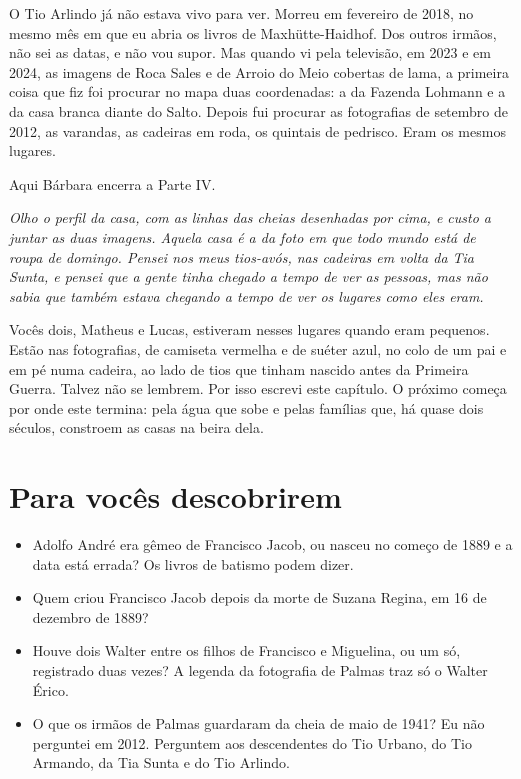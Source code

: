 \documentclass[
  brazilian,
  11pt,
  openany]{book}
\providecommand{\tightlist}{%
  \setlength{\itemsep}{0pt}\setlength{\parskip}{0pt}}
\begin{document}
O Tio Arlindo já não estava vivo para ver. Morreu em fevereiro de 2018,
no mesmo mês em que eu abria os livros de Maxhütte-Haidhof. Dos outros
irmãos, não sei as datas, e não vou supor. Mas quando vi pela televisão,
em 2023 e em 2024, as imagens de Roca Sales e de Arroio do Meio cobertas
de lama, a primeira coisa que fiz foi procurar no mapa duas coordenadas:
a da Fazenda Lohmann e a da casa branca diante do Salto. Depois fui
procurar as fotografias de setembro de 2012, as varandas, as cadeiras em
roda, os quintais de pedrisco. Eram os mesmos lugares.

Aqui Bárbara encerra a Parte IV.

\emph{Olho o perfil da casa, com as linhas das cheias desenhadas por
cima, e custo a juntar as duas imagens. Aquela casa é a da foto em que
todo mundo está de roupa de domingo. Pensei nos meus tios-avós, nas
cadeiras em volta da Tia Sunta, e pensei que a gente tinha chegado a
tempo de ver as pessoas, mas não sabia que também estava chegando a
tempo de ver os lugares como eles eram.}

Vocês dois, Matheus e Lucas, estiveram nesses lugares quando eram
pequenos. Estão nas fotografias, de camiseta vermelha e de suéter azul,
no colo de um pai e em pé numa cadeira, ao lado de tios que tinham
nascido antes da Primeira Guerra. Talvez não se lembrem. Por isso
escrevi este capítulo. O próximo começa por onde este termina: pela água
que sobe e pelas famílias que, há quase dois séculos, constroem as casas
na beira dela.

\section{Para vocês descobrirem}\label{para-vocuxeas-descobrirem-11}

\begin{itemize}
\tightlist
\item
  Adolfo André era gêmeo de Francisco Jacob, ou nasceu no começo de 1889
  e a data está errada? Os livros de batismo podem dizer.
\item
  Quem criou Francisco Jacob depois da morte de Suzana Regina, em 16 de
  dezembro de 1889?
\item
  Houve dois Walter entre os filhos de Francisco e Miguelina, ou um só,
  registrado duas vezes? A legenda da fotografia de Palmas traz só o
  Walter Érico.
\item
  O que os irmãos de Palmas guardaram da cheia de maio de 1941? Eu não
  perguntei em 2012. Perguntem aos descendentes do Tio Urbano, do Tio
  Armando, da Tia Sunta e do Tio Arlindo.
\end{itemize}
\end{document}
